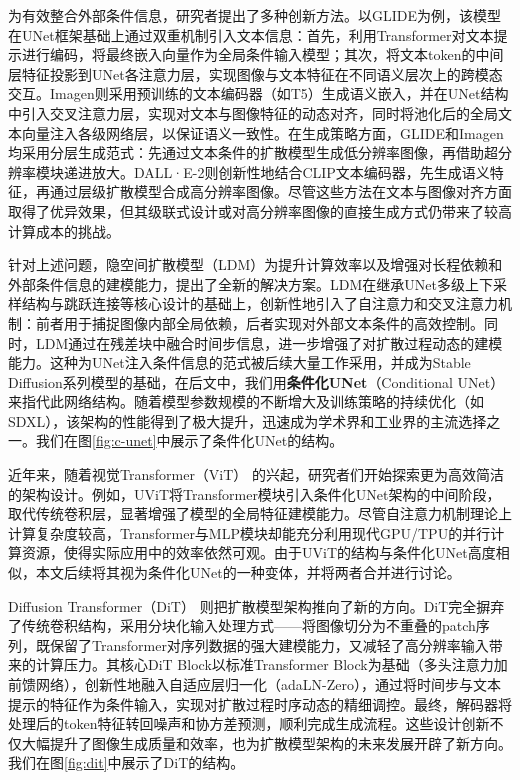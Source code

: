 \documentclass[11pt,a4paper,UTF8]{ctexart}
\begin{document}
为有效整合外部条件信息，研究者提出了多种创新方法。以GLIDE\cite{pmlr-v162-nichol22a}为例，该模型在UNet框架基础上通过双重机制引入文本信息：首先，利用Transformer对文本提示进行编码，将最终嵌入向量作为全局条件输入模型；其次，将文本token的中间层特征投影到UNet各注意力层，实现图像与文本特征在不同语义层次上的跨模态交互。Imagen\cite{saharia2022photorealistic}则采用预训练的文本编码器（如T5\cite{raffel2020exploring}）生成语义嵌入，并在UNet结构中引入交叉注意力层，实现对文本与图像特征的动态对齐，同时将池化后的全局文本向量注入各级网络层，以保证语义一致性。在生成策略方面，GLIDE和Imagen均采用分层生成范式：先通过文本条件的扩散模型生成低分辨率图像，再借助超分辨率模块递进放大。DALL·E-2\cite{ramesh2022hierarchical}则创新性地结合CLIP文本编码器，先生成语义特征，再通过层级扩散模型合成高分辨率图像。尽管这些方法在文本与图像对齐方面取得了优异效果，但其级联式设计或对高分辨率图像的直接生成方式仍带来了较高计算成本的挑战。

针对上述问题，隐空间扩散模型（LDM）\cite{rombach2022high}为提升计算效率以及增强对长程依赖和外部条件信息的建模能力，提出了全新的解决方案。LDM在继承UNet多级上下采样结构与跳跃连接等核心设计的基础上，创新性地引入了自注意力和交叉注意力机制：前者用于捕捉图像内部全局依赖，后者实现对外部文本条件的高效控制。同时，LDM通过在残差块中融合时间步信息，进一步增强了对扩散过程动态的建模能力。这种为UNet注入条件信息的范式被后续大量工作采用，并成为Stable Diffusion系列模型的基础，在后文中，我们用\textbf{条件化UNet}（Conditional UNet）来指代此网络结构。随着模型参数规模的不断增大及训练策略的持续优化（如SDXL\cite{podell2023sdxl}），该架构的性能得到了极大提升，迅速成为学术界和工业界的主流选择之一。我们在图\ref{fig:c-unet}中展示了条件化UNet的结构。

近年来，随着视觉Transformer（ViT）\cite{dosovitskiy2020image} 的兴起，研究者们开始探索更为高效简洁的架构设计。例如，UViT\cite{uvit}将Transformer模块引入条件化UNet架构的中间阶段，取代传统卷积层，显著增强了模型的全局特征建模能力。尽管自注意力机制理论上计算复杂度较高，Transformer与MLP模块却能充分利用现代GPU/TPU的并行计算资源，使得实际应用中的效率依然可观。由于UViT的结构与条件化UNet高度相似，本文后续将其视为条件化UNet的一种变体，并将两者合并进行讨论。

Diffusion Transformer（DiT）\cite{peebles2022scalable} 则把扩散模型架构推向了新的方向。DiT完全摒弃了传统卷积结构，采用分块化输入处理方式——将图像切分为不重叠的patch序列，既保留了Transformer对序列数据的强大建模能力，又减轻了高分辨率输入带来的计算压力。其核心DiT Block以标准Transformer Block为基础（多头注意力加前馈网络），创新性地融入自适应层归一化（adaLN-Zero），通过将时间步与文本提示的特征作为条件输入，实现对扩散过程时序动态的精细调控。最终，解码器将处理后的token特征转回噪声和协方差预测，顺利完成生成流程。这些设计创新不仅大幅提升了图像生成质量和效率，也为扩散模型架构的未来发展开辟了新方向。我们在图\ref{fig:dit}中展示了DiT的结构。
\end{document}
